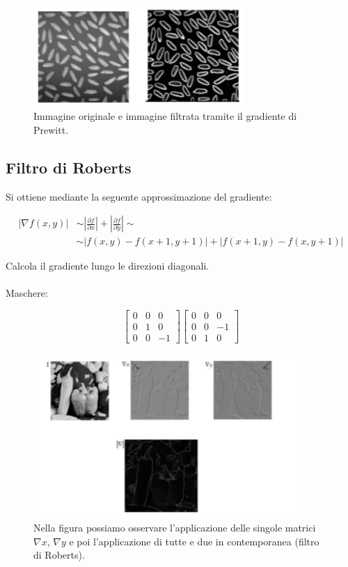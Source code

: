 \begin{figure}[H]
    \centering
    \includegraphics[width=8cm, keepaspectratio]{capitoli/immagini/imgs/prewitt.png}
    \caption{Immagine originale e immagine filtrata tramite il gradiente di Prewitt.}
\end{figure}

\subsection{Filtro di Roberts}
Si ottiene mediante la seguente approssimazione del gradiente:

\begin{align*}
    |\nabla f(x,y)| & \sim |\frac{\partial{f}}{\partial{x}}| + |\frac{\partial{f}}{\partial{y}}| \sim \\
                    & \sim |f(x,y) - f(x+1, y+1)| + |f(x+1, y) - f(x,y+1)|
\end{align*}

Calcola il gradiente lungo le direzioni diagonali. \\\\
Maschere:

\begin{center}
    \[
        \begin{bmatrix}
            0 & 0 & 0  \\
            0 & 1 & 0  \\
            0 & 0 & -1
        \end{bmatrix}
        \begin{bmatrix}
            0 & 0 & 0  \\
            0 & 0 & -1 \\
            0 & 1 & 0
        \end{bmatrix}
    \]
\end{center}

\begin{figure}[H]
    \centering
    \includegraphics[width=10cm, keepaspectratio]{capitoli/immagini/imgs/roberts.png}
    \caption{Nella figura possiamo osservare l'applicazione delle singole matrici $\nabla x$, $\nabla y$ e poi l'applicazione di tutte e due in contemporanea (filtro di Roberts).}
\end{figure}

